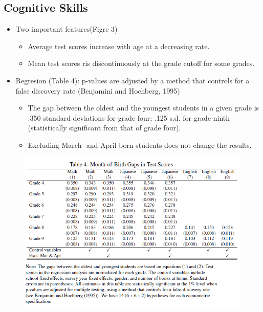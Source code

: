 \documentclass[../root]{subfiles}
\begin{document}
    \subsection{Cognitive Skills}

    \begin{itemize}
      \item Two important features(Figre 3)
      \begin{itemize}
        \item Average test scores increase with age at a decreasing rate.
        \item Mean test scores ris discontinuously at the grade cutoff for some grades.
      \end{itemize}
      \item Regresion (Table 4): p-values are adjusted by a method that controls for a false discovery rate (Benjamini and Hochberg, 1995)
      \begin{itemize}
        \item The gap between the oldest and the youngest students in a given grade is .350 standard deviations for grade four; .125 s.d. for grade ninth (statistically significant from that of grade four).
        \item Excluding March- and April-born students does not change the results.
      \end{itemize}
    \end{itemize}

    \begin{figure}[ht]
      \centering
      \includegraphics[scale = 1.2]{0904tanji/T4}
    \end{figure}
\end{document}
